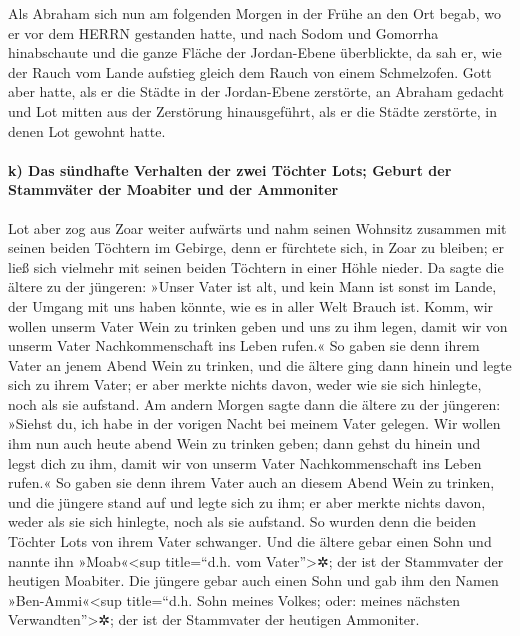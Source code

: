  Als Abraham sich nun am folgenden Morgen in der Frühe an
den Ort begab, wo er vor dem HERRN gestanden hatte,  und
nach Sodom und Gomorrha hinabschaute und die ganze Fläche der
Jordan-Ebene überblickte, da sah er, wie der Rauch vom Lande aufstieg
gleich dem Rauch von einem Schmelzofen.  Gott aber hatte,
als er die Städte in der Jordan-Ebene zerstörte, an Abraham gedacht und
Lot mitten aus der Zerstörung hinausgeführt, als er die Städte
zerstörte, in denen Lot gewohnt hatte.

\hypertarget{k-das-suxfcndhafte-verhalten-der-zwei-tuxf6chter-lots-geburt-der-stammvuxe4ter-der-moabiter-und-der-ammoniter}{%
\paragraph{k) Das sündhafte Verhalten der zwei Töchter Lots; Geburt der
Stammväter der Moabiter und der
Ammoniter}\label{k-das-suxfcndhafte-verhalten-der-zwei-tuxf6chter-lots-geburt-der-stammvuxe4ter-der-moabiter-und-der-ammoniter}}

 Lot aber zog aus Zoar weiter aufwärts und nahm seinen
Wohnsitz zusammen mit seinen beiden Töchtern im Gebirge, denn er
fürchtete sich, in Zoar zu bleiben; er ließ sich vielmehr mit seinen
beiden Töchtern in einer Höhle nieder.  Da sagte die
ältere zu der jüngeren: »Unser Vater ist alt, und kein Mann ist sonst im
Lande, der Umgang mit uns haben könnte, wie es in aller Welt Brauch ist.
 Komm, wir wollen unserm Vater Wein zu trinken geben und
uns zu ihm legen, damit wir von unserm Vater Nachkommenschaft ins Leben
rufen.«  So gaben sie denn ihrem Vater an jenem Abend
Wein zu trinken, und die ältere ging dann hinein und legte sich zu ihrem
Vater; er aber merkte nichts davon, weder wie sie sich hinlegte, noch
als sie aufstand.  Am andern Morgen sagte dann die ältere
zu der jüngeren: »Siehst du, ich habe in der vorigen Nacht bei meinem
Vater gelegen. Wir wollen ihm nun auch heute abend Wein zu trinken
geben; dann gehst du hinein und legst dich zu ihm, damit wir von unserm
Vater Nachkommenschaft ins Leben rufen.«  So gaben sie
denn ihrem Vater auch an diesem Abend Wein zu trinken, und die jüngere
stand auf und legte sich zu ihm; er aber merkte nichts davon, weder als
sie sich hinlegte, noch als sie aufstand.  So wurden denn
die beiden Töchter Lots von ihrem Vater schwanger.  Und
die ältere gebar einen Sohn und nannte ihn »Moab«\textless sup
title=``d.h. vom Vater''\textgreater✲; der ist der Stammvater der
heutigen Moabiter.  Die jüngere gebar auch einen Sohn und
gab ihm den Namen »Ben-Ammi«\textless sup title=``d.h. Sohn meines
Volkes; oder: meines nächsten Verwandten''\textgreater✲; der ist der
Stammvater der heutigen Ammoniter.

